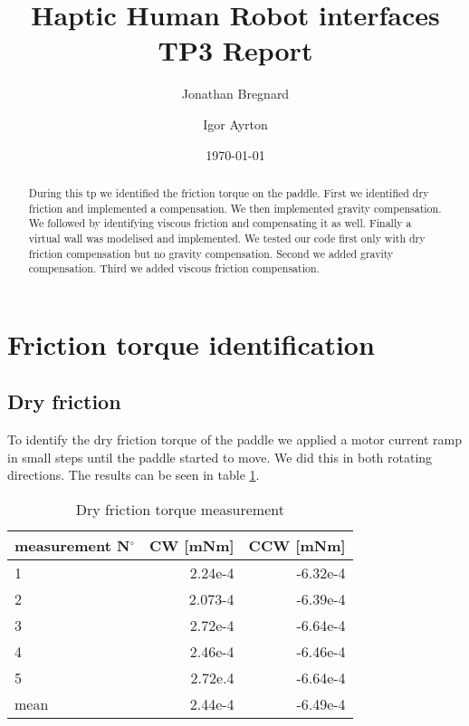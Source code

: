 \documentclass[11pt,a4paper,oneside,notitlepage]{article}
\begin{document}
\title{Haptic Human Robot interfaces \\
\large TP3 Report}
\author{Jonathan Bregnard \and Igor Ayrton}
\date{\today}
\maketitle

\begin{abstract}
During this tp we identified the friction torque on the paddle. First we identified dry friction and implemented a compensation. We then implemented gravity compensation. We followed by identifying viscous friction and compensating it as well. Finally a virtual wall was modelised and implemented. We tested our code first only with dry friction compensation but no gravity compensation. Second we added gravity compensation. Third we added viscous friction compensation. 
\end{abstract}




\section{Friction torque identification}

\subsection{Dry friction}
To identify the dry friction torque of the paddle we applied a motor current ramp in small steps until the paddle started to move. We did this in both rotating directions. The results can be seen in table \ref{tab:dry friction meas}.

\begin{table}[!htbp]
  \begin{center}
    \begin{tabular}{|l|r|r|}%
      \hline
        measurement N$^{\circ}$ & CW [mNm] & CCW [mNm]\\ \hline \hline
        1 & 2.24e-4 & -6.32e-4 \\ \hline
        2 & 2.073-4 & -6.39e-4\\ \hline
        3 & 2.72e-4 & -6.64e-4\\ \hline
        4 & 2.46e-4 & -6.46e-4\\ \hline
        5 & 2.72e.4 & -6.64e-4\\ \hline \hline
        mean & 2.44e-4 & -6.49e-4\\ 
         \hline
    \end{tabular}
  \end{center}
  \caption {Dry friction torque measurement} \label{tab:dry friction meas} 
\end{table}
\end{document}
